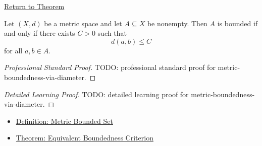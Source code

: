 \newpage
{}
\label{prf:metric-boundedness-via-diameter}

\begin{remark*}[Return]
\hyperref[thm:metric-boundedness-via-diameter]{Return to Theorem}
\end{remark*}

\begin{theorem*}
Let \((X,d)\) be a metric space and let \(A\subseteq X\) be nonempty.  Then
\(A\) is bounded if and only if there exists \(C>0\) such that
\[
  d(a,b)\leq C
\]
for all \(a,b\in A\).
\end{theorem*}

\begin{proof}[Professional Standard Proof]
\LRAProofBodyStart
TODO: professional standard proof for metric-boundedness-via-diameter.
\end{proof}

\begin{proof}[Detailed Learning Proof]
\LRAProofBodyStart
TODO: detailed learning proof for metric-boundedness-via-diameter.
\end{proof}

\begin{remark*}
\end{remark*}

\begin{dependencies}
\begin{itemize}
  \item \hyperref[def:metric-bounded-set]{Definition: Metric Bounded Set}
  \item \hyperref[thm:metric-equivalent-boundedness-criterion]{Theorem: Equivalent Boundedness Criterion}
\end{itemize}
\end{dependencies}

\clearpage
